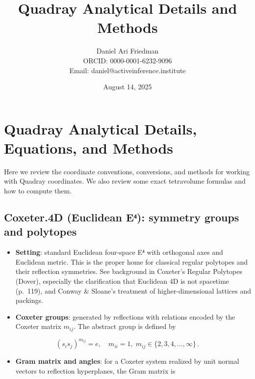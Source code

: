\documentclass[
]{article}
\title{Quadray Analytical Details and Methods}
\author{Daniel Ari Friedman\\ ORCID: 0000-0001-6232-9096\\ Email: daniel@activeinference.institute}
\date{August 14, 2025}
\providecommand{\tightlist}{%
  \setlength{\itemsep}{0pt}\setlength{\parskip}{0pt}}
\begin{document}
\maketitle

\hypertarget{quadray-analytical-details-equations-and-methods}{%
\section{Quadray Analytical Details, Equations, and
Methods}\label{quadray-analytical-details-equations-and-methods}}

Here we review the coordinate conventions, conversions, and methods for
working with Quadray coordinates. We also review some exact tetravolume
formulas and how to compute them.

\hypertarget{coxeter.4d-euclidean-eux2074-symmetry-groups-and-polytopes}{%
\subsection{Coxeter.4D (Euclidean E⁴): symmetry groups and
polytopes}\label{coxeter.4d-euclidean-eux2074-symmetry-groups-and-polytopes}}

\begin{itemize}
\tightlist
\item
  \textbf{Setting}: standard Euclidean four-space E⁴ with orthogonal
  axes and Euclidean metric. This is the proper home for classical
  regular polytopes and their reflection symmetries. See background in
  Coxeter's Regular Polytopes (Dover), especially the clarification that
  Euclidean 4D is not spacetime (p.~119), and Conway \& Sloane's
  treatment of higher-dimensional lattices and packings.
\item
  \textbf{Coxeter groups}: generated by reflections with relations
  encoded by the Coxeter matrix \(m_{ij}\). The abstract group is
  defined by
\end{itemize}

\begin{equation}\label{eq:coxeter_relations}
(s_i s_j)^{m_{ij}} = e,\quad m_{ii}=1,\; m_{ij}\in\{2,3,4,\ldots,\infty\}\,.
\end{equation}

\begin{itemize}
\tightlist
\item
  \textbf{Gram matrix and angles}: for a Coxeter system realized by unit
  normal vectors to reflection hyperplanes, the Gram matrix is
\end{itemize}
\end{document}
